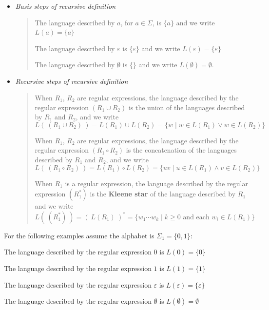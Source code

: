 \documentclass[12pt, oneside]{article}
\begin{document}
\begin{itemize}
    \item[] {\it Basis steps of recursive definition}
    \begin{quote}    
        The language described by $a$, for $a \in \Sigma$, is $\{a\}$ and we write 
        $L(a) = \{a\}$
    
        The language described by $\varepsilon$ is $\{\varepsilon\}$ and we write 
        $L(\varepsilon) = \{ \varepsilon\}$
    
        The language described by $\emptyset$ is $\{\}$ and we write
        $L(\emptyset) = \emptyset$.
    \end{quote}
    
    \item[] {\it Recursive steps of recursive definition}
    \begin{quote}
        When $R_1$, $R_2$ are regular expressions, the language described by the regular
        expression $(R_1 \cup R_2)$ is the union of the languages described by $R_1$ and $R_2$, 
        and we write 
        $$L(~(R_1 \cup R_2)~) = L(R_1) \cup L(R_2) = \{ w \mid w \in L(R_1) \lor w \in L(R_2)\}$$
    
        When $R_1$, $R_2$ are regular expressions, the language described by the regular
        expression $(R_1 \circ R_2)$ is the concatenation of the languages described by $R_1$ and $R_2$, 
        and we write 
        $$L(~(R_1 \circ R_2)~) = L(R_1) \circ L(R_2) = \{ uv \mid u \in L(R_1) \land v \in L(R_2)\}$$
    
        When $R_1$ is a regular expression, the language described by the regular 
        expression $(R_1^*)$ is the {\bf Kleene star} of the language described by $R_1$ and we write
        $$L(~(R_1^*)~) = (~L(R_1)~)^* = \{ w_1 \cdots w_k \mid k \geq 0 \textrm{ and each } w_i \in L(R_1)\}$$
    \end{quote}
\end{itemize}
  
\newpage
For the following examples assume the alphabet is $\Sigma_1 =  \{0,1\}$:
    
The language described by the regular expression $0$ is $L(0) = \{ 0 \}$

The language described by the regular expression $1$ is $L(1)  = \{ 1 \}$

The language described by the regular expression $\varepsilon$ is $L(\varepsilon) = \{ \varepsilon  \}$

The language described by the regular expression $\emptyset$ is $L(\emptyset) = \emptyset$
\end{document}
